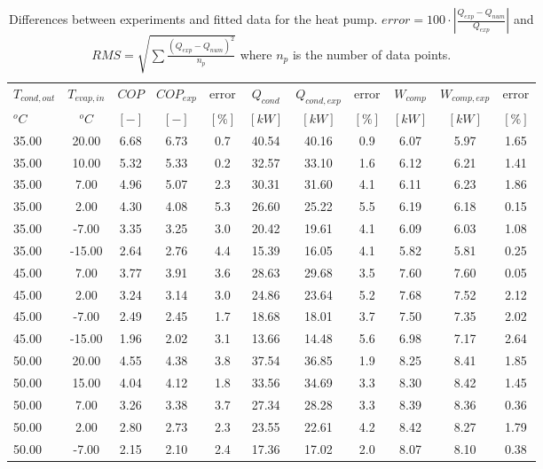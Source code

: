 \documentclass[english]{SPFShortReport}
\begin{document}
\begin{table}[!ht]
\begin{small}
\caption{Differences between experiments and fitted data for the heat pump.          $error=100 \cdot |\frac{Q_{exp}-Q_{num}}{Q_{exp}}|$ and $RMS = \sqrt { \sum{\frac{(Q_{exp}-Q_{num})^2}{n_p}} }$ where $n_p$ is the number of data points.}
\begin{center}
\resizebox{12cm}{!} 
{
\begin{tabular}{l | c c c c c c c c c c } 
\hline
\hline
$T_{cond,out}$ &$T_{evap,in}$ &$COP$ &$COP_{exp}$ &error &$Q_{cond}$ &$Q_{cond,exp}$ &error &$W_{comp}$ &$W_{comp,exp}$ &error \\ 
$^oC$ &$^oC$ &$[-]$ &$[-]$ &$[\%]$ &$[kW]$ &$[kW]$ &$[\%]$ &$[kW]$ &$[kW]$ &$[\%]$\\ 
\hline
35.00  & 20.00 & 6.68 & 6.73 & 0.7 & 40.54 & 40.16 & 0.9 & 6.07 & 5.97 & 1.65\\ 
35.00  & 10.00 & 5.32 & 5.33 & 0.2 & 32.57 & 33.10 & 1.6 & 6.12 & 6.21 & 1.41\\ 
35.00  & 7.00 & 4.96 & 5.07 & 2.3 & 30.31 & 31.60 & 4.1 & 6.11 & 6.23 & 1.86\\ 
35.00  & 2.00 & 4.30 & 4.08 & 5.3 & 26.60 & 25.22 & 5.5 & 6.19 & 6.18 & 0.15\\ 
35.00  & -7.00 & 3.35 & 3.25 & 3.0 & 20.42 & 19.61 & 4.1 & 6.09 & 6.03 & 1.08\\ 
35.00  & -15.00 & 2.64 & 2.76 & 4.4 & 15.39 & 16.05 & 4.1 & 5.82 & 5.81 & 0.25\\ 
45.00  & 7.00 & 3.77 & 3.91 & 3.6 & 28.63 & 29.68 & 3.5 & 7.60 & 7.60 & 0.05\\ 
45.00  & 2.00 & 3.24 & 3.14 & 3.0 & 24.86 & 23.64 & 5.2 & 7.68 & 7.52 & 2.12\\ 
45.00  & -7.00 & 2.49 & 2.45 & 1.7 & 18.68 & 18.01 & 3.7 & 7.50 & 7.35 & 2.02\\ 
45.00  & -15.00 & 1.96 & 2.02 & 3.1 & 13.66 & 14.48 & 5.6 & 6.98 & 7.17 & 2.64\\ 
50.00  & 20.00 & 4.55 & 4.38 & 3.8 & 37.54 & 36.85 & 1.9 & 8.25 & 8.41 & 1.85\\ 
50.00  & 15.00 & 4.04 & 4.12 & 1.8 & 33.56 & 34.69 & 3.3 & 8.30 & 8.42 & 1.45\\ 
50.00  & 7.00 & 3.26 & 3.38 & 3.7 & 27.34 & 28.28 & 3.3 & 8.39 & 8.36 & 0.36\\ 
50.00  & 2.00 & 2.80 & 2.73 & 2.3 & 23.55 & 22.61 & 4.2 & 8.42 & 8.27 & 1.79\\ 
50.00  & -7.00 & 2.15 & 2.10 & 2.4 & 17.36 & 17.02 & 2.0 & 8.07 & 8.10 & 0.38\\ 

\end{tabular}}
\end{center}
\end{small}
\end{table}
\end{document}

